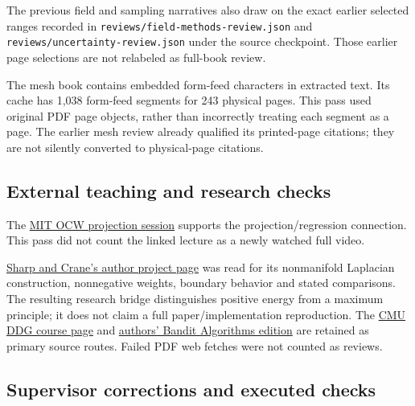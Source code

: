 The previous field and sampling narratives also draw on the exact earlier selected ranges recorded in \texttt{reviews/field-methods-review.json} and \texttt{reviews/uncertainty-review.json} under the source checkpoint. Those earlier page selections are not relabeled as full-book review.

The mesh book contains embedded form-feed characters in extracted text. Its cache has 1,038 form-feed segments for 243 physical pages. This pass used original PDF page objects, rather than incorrectly treating each segment as a page. The earlier mesh review already qualified its printed-page citations; they are not silently converted to physical-page citations.

\subsection{External teaching and research checks}\label{external-teaching-and-research-checks}

The \href{https://www.ocw.mit.edu/courses/18-06sc-linear-algebra-fall-2011/pages/least-squares-determinants-and-eigenvalues/projection-matrices-and-least-squares/}{MIT OCW projection session} supports the projection/regression connection. This pass did not count the linked lecture as a newly watched full video.

\href{https://www.cs.cmu.edu/~kmcrane/Projects/NonmanifoldLaplace/index.html}{Sharp and Crane's author project page} was read for its nonmanifold Laplacian construction, nonnegative weights, boundary behavior and stated comparisons. The resulting research bridge distinguishes positive energy from a maximum principle; it does not claim a full paper/implementation reproduction. The \href{https://www.cs.cmu.edu/~kmcrane/Projects/DGPDEC/index.html}{CMU DDG course page} and \href{https://tor-lattimore.com/downloads/book/book.pdf}{authors' Bandit Algorithms edition} are retained as primary source routes. Failed PDF web fetches were not counted as reviews.

\subsection{Supervisor corrections and executed checks}\label{supervisor-corrections-and-executed-checks}

